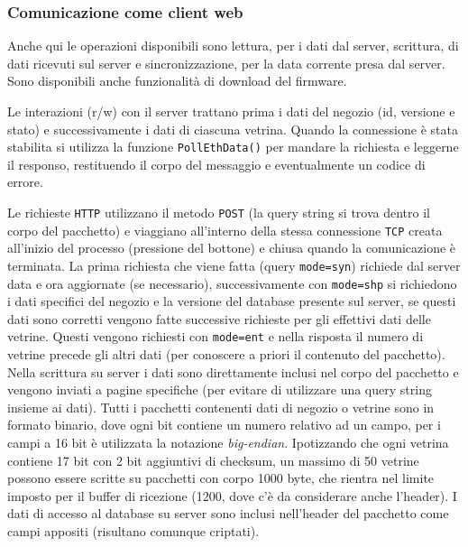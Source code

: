 \subsubsection{Comunicazione come client web}


Anche qui le operazioni disponibili sono lettura, per i dati dal server, scrittura, di dati ricevuti sul server e sincronizzazione, per la data corrente presa dal server. Sono disponibili anche funzionalit\`a di download del firmware.

Le interazioni (r/w) con il server trattano prima i dati del negozio (id, versione e stato) e successivamente i dati di ciascuna vetrina. Quando la connessione \`e stata stabilita si utilizza la funzione \texttt{PollEthData()} per mandare la richiesta e leggerne il responso, restituendo il corpo del messaggio e eventualmente un codice di errore.

Le richieste \texttt{HTTP} utilizzano il metodo \texttt{POST} (la query string si trova dentro il corpo del pacchetto) e viaggiano all'interno della stessa connessione \texttt{TCP} creata all'inizio del processo (pressione del bottone) e chiusa quando la comunicazione \`e terminata. La prima richiesta che viene fatta (query \texttt{mode=syn}) richiede dal server data e ora aggiornate (se necessario), successivamente con \texttt{mode=shp} si richiedono i dati specifici del negozio e la versione del database presente sul server, se questi dati sono corretti vengono fatte successive richieste per gli effettivi dati delle vetrine. Questi vengono richiesti con \texttt{mode=ent} e nella risposta il numero di vetrine precede gli altri dati (per conoscere a priori il contenuto del pacchetto). Nella scrittura su server i dati sono direttamente inclusi nel corpo del pacchetto e vengono inviati a pagine specifiche (per evitare di utilizzare una query string insieme ai dati). Tutti i pacchetti contenenti dati di negozio o vetrine sono in formato binario, dove ogni bit contiene un numero relativo ad un campo, per i campi a 16 bit \`e utilizzata la notazione \textit{big-endian}.
Ipotizzando che ogni vetrina contiene 17 bit con 2 bit aggiuntivi di checksum, un massimo di 50 vetrine possono essere scritte su pacchetti con corpo 1000 byte, che rientra nel limite imposto per il buffer di ricezione (1200, dove c'\`e da considerare anche l'header). I dati di accesso al database su server sono inclusi nell'header del pacchetto come campi appositi (risultano comunque criptati).

